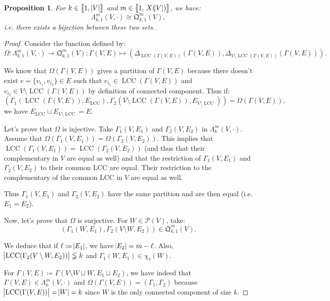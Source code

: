 \documentclass{article}
\newtheorem{proposition}[lemma]{Proposition}
\theoremstyle{definition}
\theoremstyle{remark}
\DeclareMathOperator{\LCC}{LCC}
\newcommand{\intint}[2]{\left\llbracket#1, \, #2\right\rrbracket}
\begin{document}
			\begin{proposition}\label{prp:Lambda_k,alpha^m(V, cdot) cong mathfrak Q_k,alpha^m(V)} For $k \in \intint 1{\abs V}$ and $m \in \intint 1{X(\abs V)}$, we have:
			\[\Lambda_{k,1}^m(V, \cdot) \cong \mathfrak Q_{k,1}^m(V),\]
			i.e. there exists a bijection between these two sets.
			\end{proposition}

			\begin{proof} Consider the function defined by:
			\[\Omega : \Lambda_{k,1}^m(V, \cdot) \to \mathfrak Q_{k,1}^m(V) :
				\Gamma(V, E) \mapsto \left(\Delta_{\LCC(\Gamma(V, E))}(\Gamma(V, E)), \Delta_{V \setminus \LCC(\Gamma(V, E))}(\Gamma(V, E))\right).\]

			We know that $\Omega(\Gamma(V, E))$ gives a partition of $\Gamma(V, E)$ because there doesn't exist $e = \{v_{i_1}, v_{i_2}\} \in E$ such that
			$v_{i_1} \in \LCC(\Gamma(V, E))$ and $v_{i_2} \in V \setminus \LCC(\Gamma(V, E))$ by definition of connected component. Thus if:
			\[\left(\Gamma_1(\LCC(\Gamma(V, E)), E_{\LCC}), \Gamma_2(V \setminus \LCC(\Gamma(V, E)), E_{V \setminus \LCC})\right) = \Omega(\Gamma(V, E)),\]
			we have $E_{\LCC} \sqcup E_{V \setminus \LCC} = E$.

			Let's prove that $\Omega$ is injective. Take $\Gamma_1(V, E_1)$ and $\Gamma_2(V, E_2)$ in $\Lambda_k^m(V, \cdot)$. Assume that
			$\Omega(\Gamma_1(V, E_1)) = \Omega(\Gamma_2(V, E_2))$. This implies that $\LCC(\Gamma_1(V, E_1)) = \LCC(\Gamma_2(V, E_2))$ (and thus that their complementary
			in $V$ are equal as well) and that the restriction of $\Gamma_1(V, E_1)$ and $\Gamma_2(V, E_2)$ to their common LCC are equal. Their restriction to the
			complementary of the common LCC in $V$ are equal as well.

			Thus $\Gamma_1(V, E_1)$ and $\Gamma_2(V, E_2)$ have the same partition and are then equal (i.e. $E_1=E_2$).

			Now, let's prove that $\Omega$ is surjective. For $W \in \mathcal P(V)$, take:
			\[\left(\Gamma_1(W, E_1), \Gamma_2(V \setminus W, E_2)\right) \in \mathfrak Q_{k,1}^m(V).\]

			We deduce that if $\ell \coloneqq \abs {E_1}$, we have $\abs {E_2} = m-\ell$. Also, $\abs {\LCC(\Gamma_2(V \setminus W, E_2))} \lneqq k$ and
			$\Gamma_1(W, E_1) \in \chi_\ell(W)$.

			For $\Gamma(V, E) \coloneqq \Gamma(V \setminus W \sqcup W, E_1 \sqcup E_2)$, we have indeed that $\Gamma(V, E) \in \Lambda_k^m(V, \cdot)$ and
			$\Omega(\Gamma(V, E)) = \left(\Gamma_1, \Gamma_2\right)$ because $\abs {\LCC(\Gamma(V, E))} = \abs {W} = k$ since $W$ is the only connected
			component of size $k$.
			\end{proof}
\end{document}
